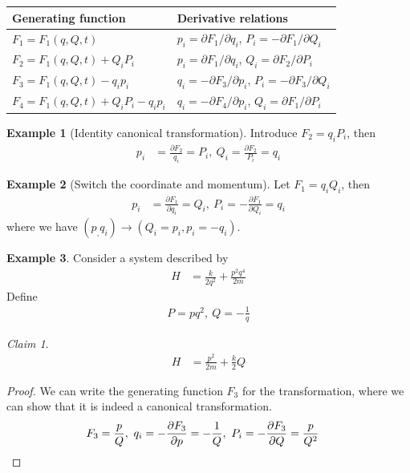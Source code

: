 \documentclass[twoside,9pt]{article}
\numberwithin{equation}{section} %
\newcommand{\lms}{\fontfamily{lmss}\selectfont} %
\theoremstyle{definition}
\newtheorem{example}{\lms Example}[section]
\theoremstyle{remark}
\newtheorem*{claim}{Claim}
\begin{document}
\begin{table}[H]
\centering
\begin{tabular}{ll}
    \toprule
    Generating function & Derivative relations\\
    \midrule
    $F_1=F_1(q, Q, t)$ & $p_i=\partial F_1/\partial q_i$, $P_i=-\partial F_1/\partial Q_i$\\
    $F_2=F_1(q, Q, t)+Q_iP_i$ & $p_i=\partial F_1/\partial q_i$, $Q_i=\partial F_2/\partial P_i$\\
    $F_3=F_1(q, Q, t)-q_ip_i$ & $q_i=-\partial F_3/\partial p_i$, $P_i=-\partial F_3/\partial Q_i$\\
    $F_4=F_1(q, Q, t)+Q_iP_i-q_ip_i$ & $q_i=-\partial F_4/\partial p_i$, $Q_i=\partial F_1/\partial P_i$\\
    \bottomrule
\end{tabular}
\end{table}
\begin{example}[Identity canonical transformation]
Introduce $F_2 = q_iP_i$, then
\begin{align}
    p_i &= \frac{\partial F_2}{q_i} = P_i,~
    Q_i  = \frac{\partial F_2}{P_i} = q_i
\end{align}    
\end{example}
\begin{example}[Switch the coordinate and momentum]
Let $F_1 = q_iQ_i$, then
\begin{align}
    p_i &= \frac{\partial F_1}{\partial q_i} = Q_i,~
    P_i  = -\frac{\partial F_1}{\partial Q_i} = q_i
\end{align}
where we have $(p_, q_i)\rightarrow (Q_i=p_i, p_i=-q_i)$.
\end{example}
\begin{example}
Consider a system described by
\begin{align*}
    H &= \frac{k}{2q^2 } + \frac{p^2q^4 }{2m }
\end{align*}
Define 
\begin{align*}
    P = pq^2,~ Q = -\frac{1}{q}
\end{align*}
\begin{claim}
\begin{align*}
    H &= \frac{p^2}{2m} + \frac{k}{2}Q
\end{align*}
\end{claim}
\begin{proof}
We can write the generating function $F_3$ for the transformation,
where we can show that it is indeed a canonical transformation.
\begin{align*}
    F_3 &= \frac{p}{Q},~
    q_i = -\frac{\partial F_3}{\partial p} = -\frac{1}{Q},~
    P_i = -\frac{\partial F_3}{\partial Q} = \frac{p}{Q^2}
    \qedhere
\end{align*}
\end{proof}
\end{example}
\end{document}
